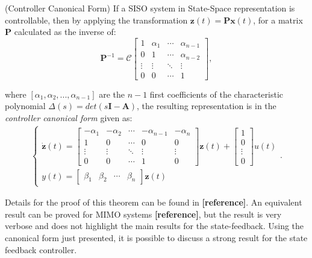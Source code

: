 \documentclass[a4paper,11pt]{book}
\numberwithin{figure}{chapter}
\numberwithin{equation}{chapter}
\numberwithin{table}{chapter}
\newtheorem{theorem}{Theorem}[chapter]
\theoremstyle{definition}
\newcounter{boxed-theorem}
\newenvironment{boxed-theorem}[1]
{\begin{shaded} \begin{theorem}{#1}}
{\end{theorem} \end{shaded}}
\newcounter{boxed-definition}
\begin{document}
\begin{boxed-theorem}{(Controller Canonical Form)} \label{th:controlCanon}
    If a SISO system in State-Space representation is controllable, then by applying the transformation $\bm{z}(t) = \bm{P}\bm{x}(t)$, for a matrix $\bm{P}$ calculated as the inverse of:
    \begin{equation}
        \bm{P}^{-1} = \bm{\mathcal{C}} \begin{bmatrix}
        1 & \alpha_1 & \cdots  & \alpha_{n-1} \\
        0 & 1 & \cdots & \alpha_{n-2} \\
        \vdots & \vdots & \ddots & \vdots \\
        0 & 0 & \cdots &1
        \end{bmatrix}
    ,\end{equation}
    
    \noindent where $[\alpha_1, \alpha_2, ..., \alpha_{n-1}]$ are the $n-1$ first coefficients of the characteristic polynomial $\Delta(s) = det(s\bm{I} - \bm{A})$, the resulting representation is in the \textit{controller canonical form} given as:
    \begin{align}
    \begin{cases}
        \dot{\bm{z}}(t) = \begin{bmatrix}
            -\alpha_1 & -\alpha_2 & \cdots & -\alpha_{n-1} & -\alpha_n \\
            1 & 0 & \cdots & 0 & 0 \\
            \vdots & \vdots & \ddots & \vdots & \vdots \\
            0 & 0 & \cdots & 1 & 0 
        \end{bmatrix} \bm{z}(t) + \begin{bmatrix}
            1 \\ 0 \\ \vdots \\ 0
        \end{bmatrix} u(t) \\
        y(t) = \begin{bmatrix} \beta_1 & \beta_2 & \cdots & \beta_n \end{bmatrix} \bm{z}(t)
    \end{cases}
    .\end{align}
\end{boxed-theorem} 

Details for the proof of this theorem can be found in \textbf{[reference]}. An equivalent result can be proved for MIMO systems \textbf{[reference]}, but the result is very verbose and does not highlight the main results for the state-feedback. Using the canonical form just presented, it is possible to discuss a strong result for the state feedback controller.
\end{document}
